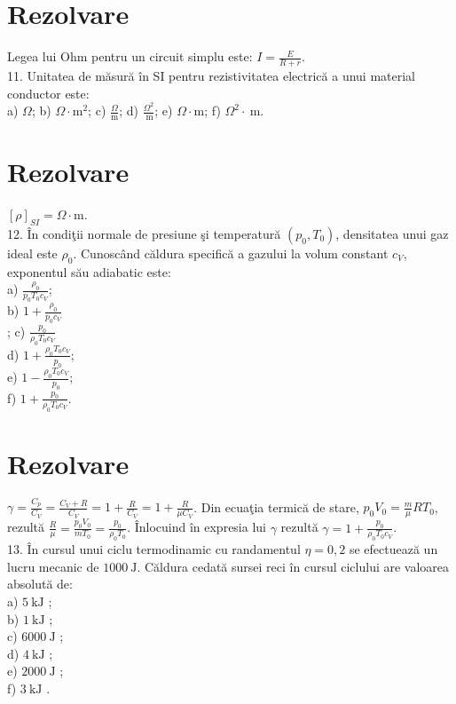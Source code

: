 \section*{Rezolvare}
Legea lui Ohm pentru un circuit simplu este: $I=\frac{E}{R+r}$.\\
11. Unitatea de măsură în SI pentru rezistivitatea electrică a unui material conductor este:\\
a) $\Omega$; b) $\Omega \cdot \mathrm{m}^{2}$; c) $\frac{\Omega}{\mathrm{m}}$; d) $\frac{\Omega^{2}}{\mathrm{~m}}$; e) $\Omega \cdot \mathrm{m}$; f) $\Omega^{2} \cdot \mathrm{~m}$.

\section*{Rezolvare}
$[\rho]_{S I}=\Omega \cdot \mathrm{m}$.\\
12. În condiţii normale de presiune şi temperatură $\left(p_{0}, T_{0}\right)$, densitatea unui gaz ideal este $\rho_{0}$. Cunoscând căldura specifică a gazului la volum constant $c_{V}$, exponentul său adiabatic este:\\
a) $\frac{\rho_{0}}{p_{0} T_{0} c_{V}}$;\\
b) $1+\frac{\rho_{0}}{p_{0} c_{V}}$\\
; c) $\frac{p_{0}}{\rho_{0} T_{0} c_{V}}$\\
d) $1+\frac{\rho_{0} T_{0} c_{V}}{p_{0}}$;\\
e) $1-\frac{\rho_{0} T_{0} c_{V}}{p_{0}}$;\\
f) $1+\frac{p_{0}}{\rho_{0} T_{0} c_{V}}$.

\section*{Rezolvare}
$\gamma=\frac{C_{p}}{C_{V}}=\frac{C_{V}+R}{C_{V}}=1+\frac{R}{C_{V}}=1+\frac{R}{\mu C_{V}}$. Din ecuaţia termică de stare, $p_{0} V_{0}=\frac{m}{\mu} R T_{0}$, rezultă $\frac{R}{\mu}=\frac{p_{0} V_{0}}{m T_{0}}=\frac{p_{0}}{\rho_{0} T_{0}}$. Înlocuind în expresia lui $\gamma$ rezultă $\gamma=1+\frac{p_{0}}{\rho_{0} T_{0} c_{V}}$.\\
13. În cursul unui ciclu termodinamic cu randamentul $\eta=0,2$ se efectuează un lucru mecanic de $1000 \mathrm{~J}$. Căldura cedată sursei reci în cursul ciclului are valoarea absolută de:\\
a) $5 \mathrm{~kJ}$ ;\\
b) $1 \mathrm{~kJ}$ ;\\
c) $6000 \mathrm{~J}$ ;\\
d) $4 \mathrm{~kJ}$ ;\\
e) $2000 \mathrm{~J}$ ;\\
f) $3 \mathrm{~kJ}$ .

